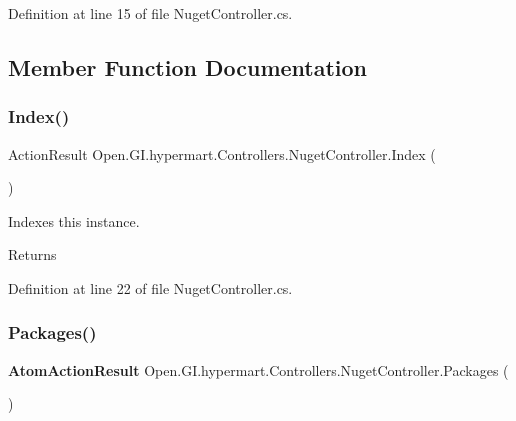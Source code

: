Definition at line 15 of file Nuget\+Controller.\+cs.



\subsection{Member Function Documentation}
\mbox{\label{class_open_1_1_g_i_1_1hypermart_1_1_controllers_1_1_nuget_controller_a4512f0f0edfb480430dea27f009d37a6}} 
\subsubsection{Index()}
{\footnotesize\ttfamily Action\+Result Open.\+G\+I.\+hypermart.\+Controllers.\+Nuget\+Controller.\+Index (\begin{DoxyParamCaption}{ }\end{DoxyParamCaption})}



Indexes this instance. 

\begin{DoxyReturn}{Returns}

\end{DoxyReturn}


Definition at line 22 of file Nuget\+Controller.\+cs.

\mbox{\label{class_open_1_1_g_i_1_1hypermart_1_1_controllers_1_1_nuget_controller_a8b2f4aa532a73eaacab1efcfd3fed054}} 
\subsubsection{Packages()}
{\footnotesize\ttfamily \textbf{ Atom\+Action\+Result} Open.\+G\+I.\+hypermart.\+Controllers.\+Nuget\+Controller.\+Packages (\begin{DoxyParamCaption}{ }\end{DoxyParamCaption})}




